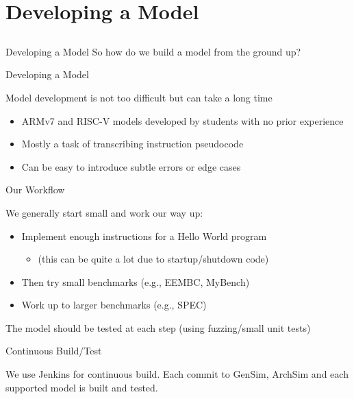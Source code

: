 \section{Developing a Model}
\subsection{}

\begin{frame}{Developing a Model}
So how do we build a model from the ground up?
\end{frame}

\begin{frame}{Developing a Model}

Model development is not too difficult but can take a long time

\begin{itemize}
\item ARMv7 and RISC-V models developed by students with no prior experience
\item Mostly a task of transcribing instruction pseudocode
\item Can be easy to introduce subtle errors or edge cases
\end{itemize}

\end{frame}

\begin{frame}{Our Workflow}

We generally start small and work our way up:
\begin{itemize}
\item Implement enough instructions for a Hello World program
\begin{itemize}
\item (this can be quite a lot due to startup/shutdown code)
\end{itemize}
\item Then try small benchmarks (e.g., EEMBC, MyBench)
\item Work up to larger benchmarks (e.g., SPEC)
\end{itemize}

The model should be tested at each step (using fuzzing/small unit tests)

\end{frame}

\begin{frame}{Continuous Build/Test}

We use Jenkins for continuous build. Each commit to GenSim, ArchSim and 
each supported model is built and tested.


\end{frame}

